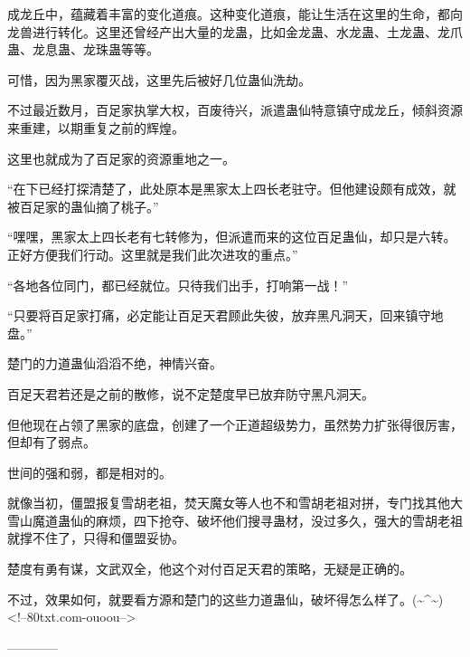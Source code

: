 \begin{this_body}
成龙丘中，蕴藏着丰富的变化道痕。这种变化道痕，能让生活在这里的生命，都向龙兽进行转化。这里还曾经产出大量的龙蛊，比如金龙蛊、水龙蛊、土龙蛊、龙爪蛊、龙息蛊、龙珠蛊等等。

可惜，因为黑家覆灭战，这里先后被好几位蛊仙洗劫。

不过最近数月，百足家执掌大权，百废待兴，派遣蛊仙特意镇守成龙丘，倾斜资源来重建，以期重复之前的辉煌。

这里也就成为了百足家的资源重地之一。

“在下已经打探清楚了，此处原本是黑家太上四长老驻守。但他建设颇有成效，就被百足家的蛊仙摘了桃子。”

“嘿嘿，黑家太上四长老有七转修为，但派遣而来的这位百足蛊仙，却只是六转。正好方便我们行动。这里就是我们此次进攻的重点。”

“各地各位同门，都已经就位。只待我们出手，打响第一战！”

“只要将百足家打痛，必定能让百足天君顾此失彼，放弃黑凡洞天，回来镇守地盘。”

楚门的力道蛊仙滔滔不绝，神情兴奋。

百足天君若还是之前的散修，说不定楚度早已放弃防守黑凡洞天。

但他现在占领了黑家的底盘，创建了一个正道超级势力，虽然势力扩张得很厉害，但却有了弱点。

世间的强和弱，都是相对的。

就像当初，僵盟报复雪胡老祖，焚天魔女等人也不和雪胡老祖对拼，专门找其他大雪山魔道蛊仙的麻烦，四下抢夺、破坏他们搜寻蛊材，没过多久，强大的雪胡老祖就撑不住了，只得和僵盟妥协。

楚度有勇有谋，文武双全，他这个对付百足天君的策略，无疑是正确的。

不过，效果如何，就要看方源和楚门的这些力道蛊仙，破坏得怎么样了。(\~{}\^{}\~{})<!--80txt.com-ouoou-->

------------

\end{this_body}

